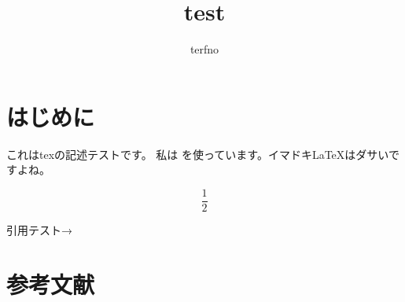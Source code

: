 \documentclass[a4paper]{article}
\begin{document}
  \title{test}
  \author{terfno}
  \maketitle

  \section{はじめに}
  これはtexの記述テストです。
  私は {\XeTeX} を使っています。イマドキ{\LaTeX}はダサいですよね。

  $$
    \frac{1}{2}
  $$

  引用テスト→\cite{lecun2015deep}

  \section{参考文献}
  
  
\end{document}
